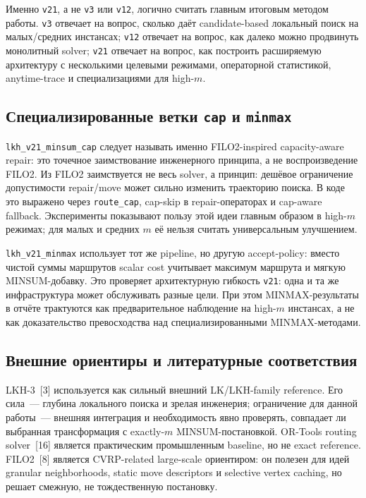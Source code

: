 \documentclass[14pt,a4paper]{extarticle}
\newcommand{\source}[1]{[#1]}
\begin{document}
Именно \texttt{v21}, а не \texttt{v3} или \texttt{v12}, логично считать главным итоговым методом работы. \texttt{v3} отвечает на вопрос, сколько даёт candidate-based локальный поиск на малых/средних инстансах; \texttt{v12} отвечает на вопрос, как далеко можно продвинуть монолитный solver; \texttt{v21} отвечает на вопрос, как построить расширяемую архитектуру с несколькими целевыми режимами, операторной статистикой, anytime-trace и специализациями для high-$m$.

\subsection{Специализированные ветки \texttt{cap} и \texttt{minmax}}

\texttt{lkh\_v21\_minsum\_cap} следует называть именно FILO2-inspired capacity-aware repair: это точечное заимствование инженерного принципа, а не воспроизведение FILO2. Из FILO2 заимствуется не весь solver, а принцип: дешёвое ограничение допустимости repair/move может сильно изменить траекторию поиска. В коде это выражено через \texttt{route\_cap}, cap-skip в repair-операторах и cap-aware fallback. Эксперименты показывают пользу этой идеи главным образом в high-$m$ режимах; для малых и средних $m$ её нельзя считать универсальным улучшением.

\texttt{lkh\_v21\_minmax} использует тот же pipeline, но другую accept-policy: вместо чистой суммы маршрутов scalar cost учитывает максимум маршрута и мягкую MINSUM-добавку. Это проверяет архитектурную гибкость \texttt{v21}: одна и та же инфраструктура может обслуживать разные цели. При этом MINMAX-результаты в отчёте трактуются как предварительное наблюдение на high-$m$ инстансах, а не как доказательство превосходства над специализированными MINMAX-методами.

\subsection{Внешние ориентиры и литературные соответствия}

LKH-3~\source{3} используется как сильный внешний LK/LKH-family reference. Его сила~--- глубина локального поиска и зрелая инженерия; ограничение для данной работы~--- внешняя интеграция и необходимость явно проверять, совпадает ли выбранная трансформация с exactly-$m$ MINSUM-постановкой. OR-Tools routing solver~\source{16} является практическим промышленным baseline, но не exact reference. FILO2~\source{8} является CVRP-related large-scale ориентиром: он полезен для идей granular neighborhoods, static move descriptors и selective vertex caching, но решает смежную, не тождественную постановку.
\end{document}
